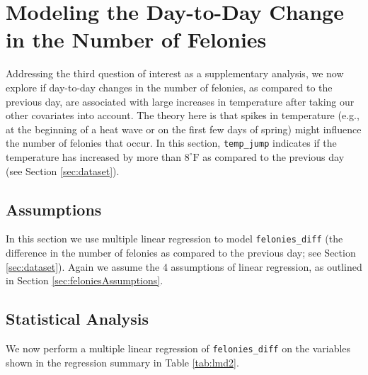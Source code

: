 \documentclass[11pt,notitlepage]{article}
\newcommand{\degf}{^\circ\text{F}}
\begin{document}




\section{Modeling the Day-to-Day Change in the Number of Felonies}
\label{sec:modelingFeloniesDiff}


Addressing the third question of interest as a supplementary analysis, we now explore if day-to-day changes in the number of felonies, as compared to the previous day, are associated with large increases in temperature after taking our other covariates into account. The theory here is that spikes in temperature (e.g., at the beginning of a heat wave or on the first few days of spring) might influence the number of felonies that occur. In this section, \texttt{temp_jump} indicates if the temperature has increased by more than $8\degf$ as compared to the previous day (see Section \ref{sec:dataset}).




\subsection{Assumptions}
\label{sec:feloniesDiffAssumptions}


In this section we use multiple linear regression to model \texttt{felonies_diff} (the difference in the number of felonies as compared to the previous day; see Section \ref{sec:dataset}). Again we assume the 4 assumptions of linear regression, as outlined in Section \ref{sec:feloniesAssumptions}.

\subsection{Statistical Analysis}
\label{sec:modelFeloniesDiffMultipleRegression}


We now perform a multiple linear regression of \texttt{felonies_diff} on the variables shown in the regression summary in Table \ref{tab:lmd2}.
\end{document}
